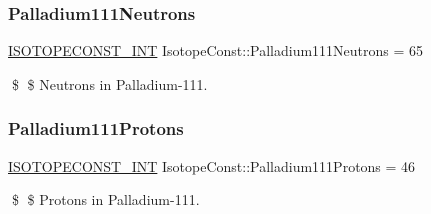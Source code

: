 \subsubsection{\texorpdfstring{Palladium111\+Neutrons}{Palladium111Neutrons}}
{\footnotesize\ttfamily \mbox{\hyperlink{group___isotope_const-_macros_ga5f18360b3e99483a35c32d789e62621c}{I\+S\+O\+T\+O\+P\+E\+C\+O\+N\+S\+T\+\_\+\+I\+NT}} Isotope\+Const\+::\+Palladium111\+Neutrons = 65}

\$ \$ Neutrons in Palladium-\/111. \mbox{\label{group___isotope_const-_palladium-_pd111_ga0da3865f9c43e44bf83485decbf8e1f6}} 
\subsubsection{\texorpdfstring{Palladium111\+Protons}{Palladium111Protons}}
{\footnotesize\ttfamily \mbox{\hyperlink{group___isotope_const-_macros_ga5f18360b3e99483a35c32d789e62621c}{I\+S\+O\+T\+O\+P\+E\+C\+O\+N\+S\+T\+\_\+\+I\+NT}} Isotope\+Const\+::\+Palladium111\+Protons = 46}

\$ \$ Protons in Palladium-\/111. 